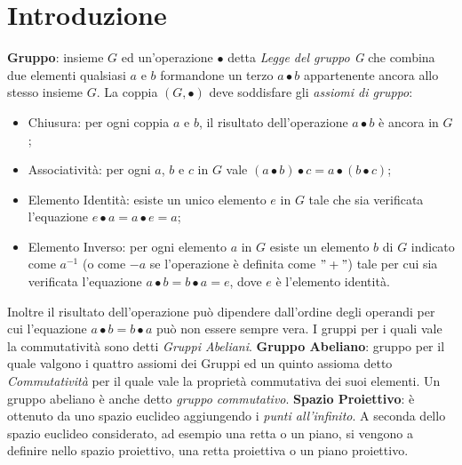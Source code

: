 \documentclass[a4paper,12pt]{tesiinfo}
\begin{document}
\maketitle
\contentspage
\chapter{Introduzione}


\textbf{Gruppo}: insieme $G$ ed un'operazione $\bullet$ detta \textit{Legge del gruppo G} che combina due elementi qualsiasi $a$ e $b$ formandone un terzo $a\bullet b$ appartenente ancora allo stesso insieme $G$. 
La coppia $(G, \bullet)$ deve soddisfare gli \textit{assiomi di gruppo}:
\begin{itemize}
    \item Chiusura: per ogni coppia $a$ e $b$, il risultato dell'operazione $a\bullet b$ \`e ancora in $G$;
    \item Associativit\`a: per ogni $a$, $b$ e $c$ in $G$ vale $\left ( a\bullet b \right ) \bullet c = a \bullet \left ( b \bullet c \right ) $;
    \item Elemento Identit\`a: esiste un unico elemento $e$ in $G$ tale che sia verificata l'equazione $ e \bullet a = a \bullet e = a$;
    \item Elemento Inverso: per ogni elemento $a$ in $G$ esiste un elemento $b$ di $G$ indicato come $a^{-1}$ (o come $-a$ se l'operazione \`e definita come $"+"$) tale per cui sia verificata l'equazione $ a \bullet b = b \bullet a = e$, dove $e$ \`e l'elemento identit\`a.
\end{itemize}
Inoltre il risultato dell'operazione pu\`o dipendere dall'ordine degli operandi per cui l'equazione $ a \bullet b = b \bullet a$ pu\`o non essere sempre vera. I gruppi per i quali vale la commutatività sono detti \textit{Gruppi Abeliani}.
\newline\newline
\textbf{Gruppo Abeliano}: gruppo per il quale valgono i quattro assiomi dei Gruppi ed un quinto assioma detto \textit{Commutativit\`a} per il quale vale la propriet\`a commutativa dei suoi elementi. Un gruppo abeliano \`e anche detto \textit{gruppo commutativo}.
\newline\newline
\textbf{Spazio Proiettivo}: \`e ottenuto da uno spazio euclideo aggiungendo i \textit{punti all'infinito}. A seconda dello spazio euclideo considerato, ad esempio una retta o un piano, si vengono a definire nello spazio proiettivo, una retta proiettiva o un piano proiettivo.
\end{document}
